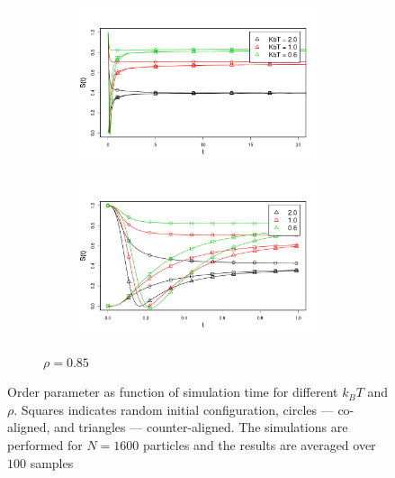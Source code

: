 \begin{figure}[h]
\begin{subfigure}[t]{0.32\textwidth}
\begin{subfigure}[t]{\textwidth}
	\centering
	\includegraphics[width=\textwidth]{Images/op_relaxation_long_rho_085.png}
\end{subfigure}
\begin{subfigure}[t]{\textwidth}
	\centering
	\includegraphics[width=\textwidth]{Images/op_relaxation_short_rho_085.png}
\end{subfigure}
	\captionsetup{justification=centering, width=0.9\columnwidth}
	\caption{$\rho = 0.85$}
\end{subfigure}
\captionsetup{justification=centering, width=0.9\columnwidth}
\caption{Order parameter as function of simulation time for different $k_BT$ and $\rho$. Squares indicates random initial configuration, circles --- co-aligned, and triangles --- counter-aligned. The simulations are performed for $N = 1600$ particles and the results are averaged over $100$ samples}
\label{fig:short_time_order_parameter_different_density}
\end{figure}

